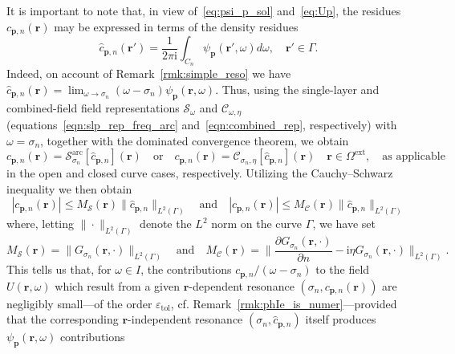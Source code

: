 \documentclass[11pt]{article}
\theoremstyle{plain}
\theoremstyle{remark}
\def \br{\mathbf{r}}
\def \bp{\mathbf{p}}
\begin{document}
 It is important to note that, in view of~\eqref{eq:psi_p_sol}
and~\eqref{eq:Up}, the residues $c_{\bp,n}(\br)$ may be expressed in
terms of the density residues
\begin{equation}\label{dens_resid}
    \widehat{c}_{\bp,n}(\br') = \frac{1}{2\pi \mathrm{i}}\int_{C_n} \psi_\bp(\br',\omega) d\omega, \quad \br' \in \Gamma.
\end{equation}
Indeed, on account of Remark~\ref{rmk:simple_reso} we have
$\widehat{c}_{\bp,n}(\br) = \lim_{\omega \to \sigma_n} (\omega - \sigma_n)
\psi_\bp(\br,\omega)$. Thus, using the single-layer and combined-field
field representations $\mathcal{S}_\omega$ and
$\mathcal{C}_{\omega, \eta}$ (equations~\eqref{eqn:slp_rep_freq_arc}
and~\eqref{eqn:combined_rep}, respectively) with $\omega = \sigma_n$,
together with the dominated convergence theorem, we obtain
\begin{equation}\label{res_alt}
  c_{\bp,n}(\br) = \mathcal{S}^\mathrm{arc}_{\sigma_n}[\widehat{c}_{\bp,n}](\br) \quad \mbox{or} \quad c_{\bp,n}(\br) = \mathcal{C}_{\sigma_n,\eta}[\widehat{c}_{\bp,n}](\br) \quad \br \in \Omega^\mathrm{ext},\quad\mbox{as applicable}
\end{equation}
in the open and closed curve cases, respectively.  Utilizing the
Cauchy–Schwarz inequality we then obtain
\begin{equation}\label{eqn:spat_res_dens_bound}
  |c_{\bp,n}(\br)| \le M_\mathcal{S}(\br) \|\widehat{c}_{\bp, n}\|_{L^2(\Gamma)} \quad \mbox{and} \quad |c_{\bp,n}(\br)| \le  M_\mathcal{C}(\br) \|\widehat{c}_{\bp, n}\|_{L^2(\Gamma)}
\end{equation}
where, letting $\|\cdot\|_{L^2(\Gamma)}$ denote the $L^2$ norm on the
curve $\Gamma$, we have set
\[
  M_\mathcal{S}(\br) =
  \|G_{\sigma_n}(\br,\cdot)\|_{L^2(\Gamma)}\quad\mbox{and}\quad
  M_\mathcal{C}(\br) =\| \frac{\partial G_{\sigma_n}(\br,\cdot)}{\partial
    n} - \mathrm{i} \eta G_{\sigma_n}(\br,\cdot)\|_{L^2(\Gamma)}.
\]
This tells us that, for $\omega \in I$, the contributions
$c_{\bp, n}/(\omega - \sigma_n)$ to the field $U(\br,\omega)$ which
result from a given $\br$-dependent resonance
$(\sigma_n, c_{\bp,n}(\br))$ are negligibly small---of the order
$\varepsilon_\mathrm{tol}$,
cf. Remark~\ref{rmk:phIe_is_numer}---provided that the corresponding
$\br$-independent resonance $(\sigma_n, \widehat{c}_{\bp,n})$ itself
produces $\psi_\bp(\br,\omega)$ contributions
\end{document}
